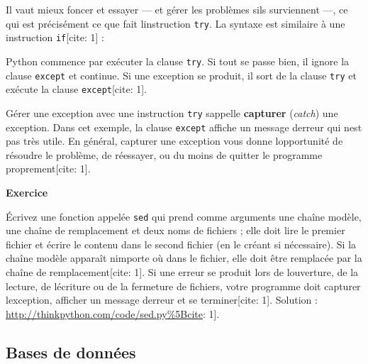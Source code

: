 Il vaut mieux foncer et essayer --- et gérer les problèmes
s\textquotesingle ils surviennent ---, ce qui est précisément ce que
fait l\textquotesingle instruction \texttt{try}. La syntaxe est
similaire à une instruction \texttt{if}{[}cite: 1{]} :

\begin{Shaded}
\begin{Highlighting}[]
\NormalTok{:}
\OperatorTok{=} \NormalTok{(}\NormalTok{)}
\NormalTok{:}
     
\end{Highlighting}
\end{Shaded}

Python commence par exécuter la clause \texttt{try}. Si tout se passe
bien, il ignore la clause \texttt{except} et continue. Si une exception
se produit, il sort de la clause \texttt{try} et exécute la clause
\texttt{except}{[}cite: 1{]}.

Gérer une exception avec une instruction \texttt{try}
s\textquotesingle appelle \textbf{capturer} (\emph{catch}) une
exception. Dans cet exemple, la clause \texttt{except} affiche un
message d\textquotesingle erreur qui n\textquotesingle est pas très
utile. En général, capturer une exception vous donne
l\textquotesingle opportunité de résoudre le problème, de réessayer, ou
du moins de quitter le programme proprement{[}cite: 1{]}.

\textbf{Exercice}

Écrivez une fonction appelée \texttt{sed} qui prend comme arguments une
chaîne modèle, une chaîne de remplacement et deux noms de fichiers ;
elle doit lire le premier fichier et écrire le contenu dans le second
fichier (en le créant si nécessaire). Si la chaîne modèle apparaît
n\textquotesingle importe où dans le fichier, elle doit être remplacée
par la chaîne de remplacement{[}cite: 1{]}. Si une erreur se produit
lors de l\textquotesingle ouverture, de la lecture, de
l\textquotesingle écriture ou de la fermeture de fichiers, votre
programme doit capturer l\textquotesingle exception, afficher un message
d\textquotesingle erreur et se terminer{[}cite: 1{]}. Solution :
\url{http://thinkpython.com/code/sed.py\%5Bcite}: 1{]}.

\hypertarget{bases-de-donnuxe9es}{%
\subsection{Bases de données}\label{bases-de-donnuxe9es}}

